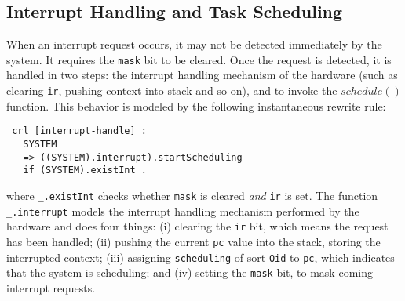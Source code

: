 \documentclass[10pt,journal]{IEEEtran}
\begin{document}
\subsection{Interrupt Handling and Task Scheduling}
\label{ss:inthandling}
When an interrupt request occurs, it may not be detected immediately
by the system. It requires the \verb|mask| bit to be cleared. Once the
request is detected, it is handled in two steps: the interrupt
handling mechanism of the hardware (such as clearing \verb|ir|,
pushing context into stack and so on), and to invoke the $schedule()$
function. This behavior is modeled by the following instantaneous
rewrite rule:
\begin{verbatim}
 crl [interrupt-handle] :
   SYSTEM 
   => ((SYSTEM).interrupt).startScheduling
   if (SYSTEM).existInt .
\end{verbatim}
where \verb|_.existInt| checks whether \verb|mask| is cleared
\emph{and} \verb|ir| is set. The function \verb|_.interrupt| models
the interrupt handling mechanism performed by the hardware and does
four things: (i) clearing the \verb|ir| bit, which means the request
has been handled; (ii) pushing the current \verb|pc| value into the
stack, storing the interrupted context; (iii) assigning
\verb|scheduling| of sort \verb|Oid| to \verb|pc|, which indicates
that the system is scheduling; and (iv) setting the \verb|mask| bit,
to mask coming interrupt requests.
\end{document}
